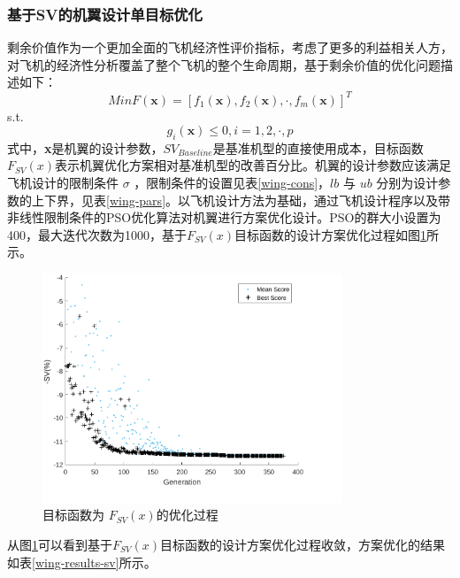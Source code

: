 \documentclass[12pt,a4paper]{report}
\begin{document}
\subsubsection{基于SV的机翼设计单目标优化}
剩余价值作为一个更加全面的飞机经济性评价指标，考虑了更多的利益相关人方，对飞机的经济性分析覆盖了整个飞机的整个生命周期，基于剩余价值的优化问题描述如下：
\begin{equation}
Min F(\textbf{x})=[f_1(\textbf{x}), f_2(\textbf{x}),\cdot, f_m(\textbf{x})]^T
\end{equation}
s.t.
\begin{equation}
g_i(\textbf{x})\le0, i=1,2,\cdot, p
\end{equation}
式中，\textbf{x}是机翼的设计参数，$S{{V}_{Baseline}}$是基准机型的直接使用成本，目标函数${{F}_{SV}}(x)
$表示机翼优化方案相对基准机型的改善百分比。机翼的设计参数应该满足飞机设计的限制条件 $ \sigma  $ ，限制条件的设置见表\ref{wing-cons}，$ lb $ 与 $ ub $ 分别为设计参数的上下界，见表\ref{wing-pars}。以飞机设计方法为基础，通过飞机设计程序以及带非线性限制条件的PSO优化算法对机翼进行方案优化设计。PSO的群大小设置为400，最大迭代次数为1000，基于${{F}_{SV}}(x)$目标函数的设计方案优化过程如图\ref{sv-results}所示。

\begin{figure}[ht!]
	\centering
	\includegraphics[width=0.8\textwidth]{./media4/image27.pdf}
	\caption{目标函数为 $ F_{SV} \left( x \right) $的优化过程}
	\label{sv-results}
\end{figure}
从图\ref{sv-results}可以看到基于${{F}_{SV}}(x)$目标函数的设计方案优化过程收敛，方案优化的结果如表\ref{wing-results-sv}所示。
\end{document}

